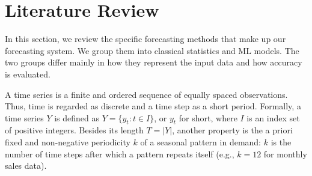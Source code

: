 \section{Literature Review}
\label{lit}

In this section, we review the specific forecasting methods that make up our
    forecasting system.
We group them into classical statistics and ML models.
The two groups differ mainly in how they represent the input data and how
    accuracy is evaluated.

A time series is a finite and ordered sequence of equally spaced observations.
Thus, time is regarded as discrete and a time step as a short period.
Formally, a time series $Y$ is defined as $Y = \{y_t: t \in I\}$, or $y_t$ for
    short, where $I$ is an index set of positive integers.
Besides its length $T = |Y|$, another property is the a priori fixed and
    non-negative periodicity $k$ of a seasonal pattern in demand:
$k$ is the number of time steps after which a pattern repeats itself (e.g.,
    $k=12$ for monthly sales data).
